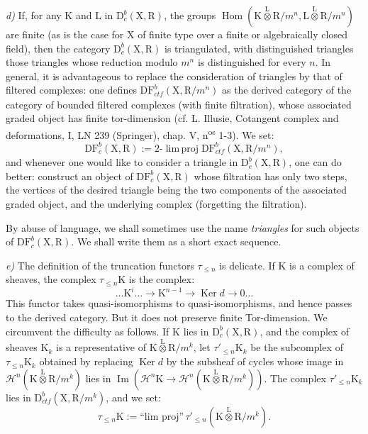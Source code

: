 \documentclass[11pt,leqno]{article}
\begin{document}
\textit{d)} If, for any \(\mathrm{K}\) and \(\mathrm{L}\) in \(\mathrm{D}_c^b(\mathrm{X},\mathrm{R})\), the groups \(\operatorname{Hom}(\mathrm{K}\overset{\mathrm{L}}{\otimes}\mathrm{R}/m^n,\mathrm{L}\overset{\mathrm{L}}{\otimes}\mathrm{R}/m^n)\) are finite (as is the case for \(\mathrm{X}\) of finite type over a finite or algebraically closed field), then the category \(\mathrm{D}_c^b(\mathrm{X},\mathrm{R})\) is triangulated, with distinguished triangles those triangles whose reduction modulo \(m^n\) is distinguished for every \(n\). In general, it is advantageous to replace the consideration of triangles by that of filtered complexes: one defines \(\mathrm{DF}_{\mathit{ctf}}^b(\mathrm{X},\mathrm{R}/m^n)\) as the derived category of the category of bounded filtered complexes (with finite filtration), whose associated graded object has finite tor-dimension (cf. L. Illusie, Cotangent complex and deformations, I, LN 239 (Springer), chap. V, n\textsuperscript{os} 1-3). We set:
\[
\mathrm{DF}_c^b(\mathrm{X},\mathrm{R})
:=2\text{-}\operatorname{lim\,proj}\mathrm{DF}_{\mathit{ctf}}^b(\mathrm{X},\mathrm{R}/m^n),
\]
and whenever one would like to consider a triangle in \(\mathrm{D}_c^b(\mathrm{X},\mathrm{R})\), one can do better: construct an object of \(\mathrm{DF}_c^b(\mathrm{X},\mathrm{R})\) whose filtration has only two steps, the vertices of the desired triangle being the two components of the associated graded object, and the underlying complex (forgetting the filtration).

By abuse of language, we shall sometimes use the name \textit{triangles} for such objects of \(\mathrm{DF}_c^b(\mathrm{X},\mathrm{R})\). We shall write them as a short exact sequence.

\textit{e)} The definition of the truncation functors \(\tau_{\leq n}\) is delicate. If \(\mathrm{K}\) is a complex of sheaves, the complex \(\tau_{\leq n}\mathrm{K}\) is the complex:
\[
\ldots\mathrm{K}^i\ldots\to\mathrm{K}^{n-1}\to\operatorname{Ker}d\to0\ldots
\]
This functor takes quasi-isomorphisms to quasi-isomorphisms, and hence passes to the derived category. But it does not preserve finite Tor-dimension. We circumvent the difficulty as follows. If \(\mathrm{K}\) lies in \(\mathrm{D}_c^b(\mathrm{X},\mathrm{R})\), and the complex of sheaves \(\mathrm{K}_k\) is a representative of \(\mathrm{K}\overset{\mathrm{L}}{\otimes}\mathrm{R}/m^k\), let \(\tau'_{\leq n}\mathrm{K}_k\) be the subcomplex of \(\tau_{\leq n}\mathrm{K}_k\) obtained by replacing \(\operatorname{Ker}d\) by the subsheaf of cycles whose image in \(\mathscr{H}^n(\mathrm{K}\overset{\mathrm{L}}{\otimes}\mathrm{R}/m^k)\) lies in \(\operatorname{Im}(\mathscr{H}^n\mathrm{K}\to\mathscr{H}^n(\mathrm{K}\overset{\mathrm{L}}{\otimes}\mathrm{R}/m^k))\). The complex \(\tau'_{\leq n}\mathrm{K}_k\) lies in \(\mathrm{D}_{\mathit{ctf}}^b(\mathrm{X},\mathrm{R}/m^k)\), and we set:
\[
\tau_{\leq n}\mathrm{K}
:=\text{“lim proj”}\,\tau'_{\leq n}(\mathrm{K}\overset{\mathrm{L}}{\otimes}\mathrm{R}/m^k).
\]
\end{document}

